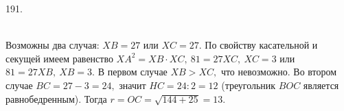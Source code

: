 191. \begin{figure}[ht!]
\end{figure}\\
Возможны два случая: $XB=27$ или $XC=27.$ По свойству касательной и секущей имеем равенство $XA^2=XB\cdot XC,\ 81=27XC,\ XC=3$ или $81=27XB,\ XB=3.$ В первом случае $XB>XC,$ что невозможно. Во втором случае $BC=27-3=24,$ значит $HC=24:2=12$ (треугольник $BOC$ является равнобедренным). Тогда $r=OC=\sqrt{144+25}=13.$\\
